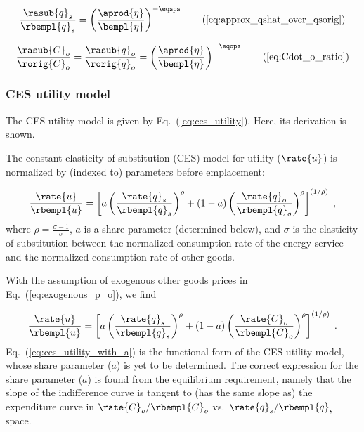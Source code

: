 \begin{equation} 
  \frac{\rasub{q}_s}{\rbempl{q}_s}
      = \left( \frac{\aprod{\eta}}{\bempl{\eta}} \right)^{-\eqsps} 
        \tag{\ref{eq:approx_qshat_over_qsorig}}
\end{equation}

\begin{equation}
  \frac{\rasub{C}_o}{\rorig{C}_o}
      = \frac{\rasub{q}_o}{\rorig{q}_o}
      = \left( \frac{\aprod{\eta}}{\bempl{\eta}} \right)^{-\eqops} \tag{\ref{eq:Cdot_o_ratio}}
\end{equation}


\subsubsection{CES utility model}
\label{sec:derivation_ces_utility}

The CES utility model is given by Eq.~(\ref{eq:ces_utility}).
Here, its derivation is shown.

The constant elasticity of substitution (CES) model for utility ($\rate{u}$)
is normalized by (indexed to) parameters before emplacement:

\begin{equation}
  \frac{\rate{u}}{\rbempl{u}} = 
  \left[ a \left( \frac{\rate{q}_s}{\rbempl{q}_s} \right)^\rho 
        + (1-a) \left( \frac{\rate{q}_o}{\rbempl{q}_o} \right)^\rho  \right]^{(1/\rho)} \; ,
\end{equation}
%
where $\rho = \frac{\sigma - 1}{\sigma}$,
$a$ is a share parameter (determined below), and 
$\sigma$ is the elasticity of substitution between
the normalized consumption rate of the energy service and 
the normalized consumption rate of other goods.

With the assumption of exogenous other goods prices 
in Eq.~(\ref{eq:exogenous_p_o}), 
we find

\begin{equation} \label{eq:ces_utility_with_a}
  \frac{\rate{u}}{\rbempl{u}} = 
  \left[ a \left( \frac{\rate{q}_s}{\rbempl{q}_s} \right)^\rho 
        + (1-a) \left( \frac{\rate{C}_o}{\rbempl{C}_o} \right)^\rho  \right]^{(1/\rho)} \; .
\end{equation}
%
Eq.~(\ref{eq:ces_utility_with_a}) is the functional form of the CES utility model,
whose share parameter ($a$) is yet to be determined.
The correct expression for the share parameter ($a$) is found from the 
equilibrium requirement,
namely that the slope of the indifference curve is tangent to 
(has the same slope as) the expenditure curve
in $\rate{C}_o/\rbempl{C}_o$ vs.\ $\rate{q}_s/\rbempl{q}_s$ space.

